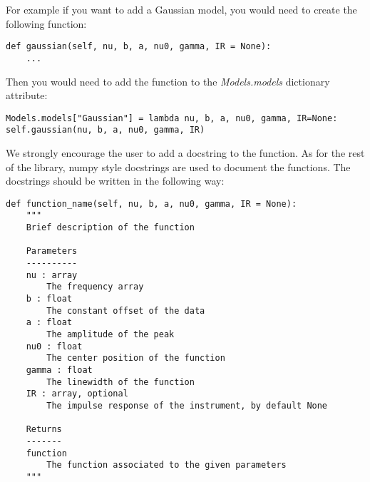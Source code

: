 For example if you want to add a Gaussian model, you would need to create the following function:
\begin{lstlisting}
def gaussian(self, nu, b, a, nu0, gamma, IR = None):
    ...
\end{lstlisting}

Then you would need to add the function to the \textit{Models.models} dictionary attribute:
\begin{lstlisting}
Models.models["Gaussian"] = lambda nu, b, a, nu0, gamma, IR=None: self.gaussian(nu, b, a, nu0, gamma, IR)
\end{lstlisting}

We strongly encourage the user to add a docstring to the function. As for the rest of the library, numpy style docstrings are used to document the functions. The docstrings should be written in the following way:

\begin{lstlisting}
def function_name(self, nu, b, a, nu0, gamma, IR = None):
    """
    Brief description of the function

    Parameters
    ----------
    nu : array
        The frequency array
    b : float
        The constant offset of the data
    a : float
        The amplitude of the peak
    nu0 : float
        The center position of the function
    gamma : float
        The linewidth of the function
    IR : array, optional
        The impulse response of the instrument, by default None

    Returns
    -------
    function
        The function associated to the given parameters
    """
\end{lstlisting}
